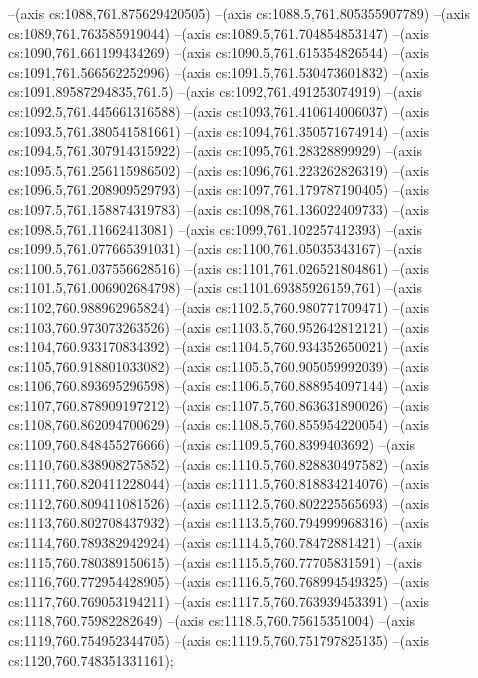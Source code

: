 --(axis cs:1088,761.875629420505)
--(axis cs:1088.5,761.805355907789)
--(axis cs:1089,761.763585919044)
--(axis cs:1089.5,761.704854853147)
--(axis cs:1090,761.661199434269)
--(axis cs:1090.5,761.615354826544)
--(axis cs:1091,761.566562252996)
--(axis cs:1091.5,761.530473601832)
--(axis cs:1091.89587294835,761.5)
--(axis cs:1092,761.491253074919)
--(axis cs:1092.5,761.445661316588)
--(axis cs:1093,761.410614006037)
--(axis cs:1093.5,761.380541581661)
--(axis cs:1094,761.350571674914)
--(axis cs:1094.5,761.307914315922)
--(axis cs:1095,761.28328899929)
--(axis cs:1095.5,761.256115986502)
--(axis cs:1096,761.223262826319)
--(axis cs:1096.5,761.208909529793)
--(axis cs:1097,761.179787190405)
--(axis cs:1097.5,761.158874319783)
--(axis cs:1098,761.136022409733)
--(axis cs:1098.5,761.11662413081)
--(axis cs:1099,761.102257412393)
--(axis cs:1099.5,761.077665391031)
--(axis cs:1100,761.05035343167)
--(axis cs:1100.5,761.037556628516)
--(axis cs:1101,761.026521804861)
--(axis cs:1101.5,761.006902684798)
--(axis cs:1101.69385926159,761)
--(axis cs:1102,760.988962965824)
--(axis cs:1102.5,760.980771709471)
--(axis cs:1103,760.973073263526)
--(axis cs:1103.5,760.952642812121)
--(axis cs:1104,760.933170834392)
--(axis cs:1104.5,760.934352650021)
--(axis cs:1105,760.918801033082)
--(axis cs:1105.5,760.905059992039)
--(axis cs:1106,760.893695296598)
--(axis cs:1106.5,760.888954097144)
--(axis cs:1107,760.878909197212)
--(axis cs:1107.5,760.863631890026)
--(axis cs:1108,760.862094700629)
--(axis cs:1108.5,760.855954220054)
--(axis cs:1109,760.848455276666)
--(axis cs:1109.5,760.8399403692)
--(axis cs:1110,760.838908275852)
--(axis cs:1110.5,760.828830497582)
--(axis cs:1111,760.820411228044)
--(axis cs:1111.5,760.818834214076)
--(axis cs:1112,760.809411081526)
--(axis cs:1112.5,760.802225565693)
--(axis cs:1113,760.802708437932)
--(axis cs:1113.5,760.794999968316)
--(axis cs:1114,760.789382942924)
--(axis cs:1114.5,760.78472881421)
--(axis cs:1115,760.780389150615)
--(axis cs:1115.5,760.77705831591)
--(axis cs:1116,760.772954428905)
--(axis cs:1116.5,760.768994549325)
--(axis cs:1117,760.769053194211)
--(axis cs:1117.5,760.763939453391)
--(axis cs:1118,760.75982282649)
--(axis cs:1118.5,760.75615351004)
--(axis cs:1119,760.754952344705)
--(axis cs:1119.5,760.751797825135)
--(axis cs:1120,760.748351331161);

